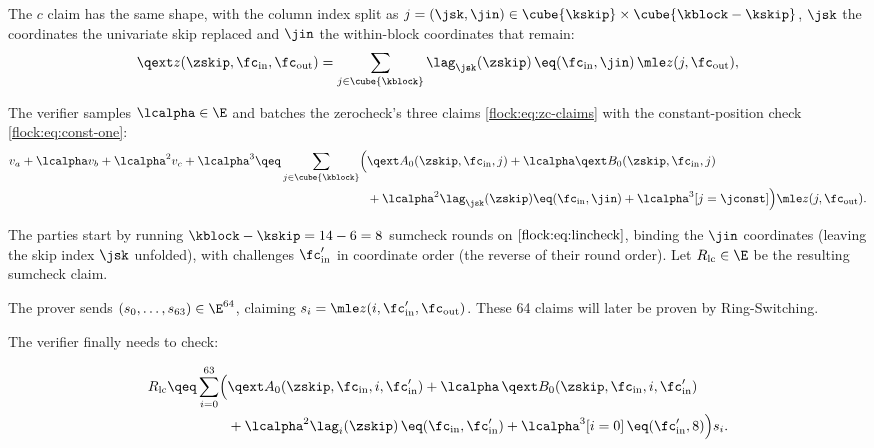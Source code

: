 The $c$ claim has the same shape, with the column index split as $j=(\jsk,\jin) \in\cube{\kskip} \times \cube{\kblock-\kskip}$, $\jsk$ the coordinates the univariate skip replaced and $\jin$ the within-block coordinates that remain:
\begin{equation}\label{flock:eq:c-as-column}
\qext z(\zskip,\fc_{\mathrm{in}},\fc_{\mathrm{out}})=\sum_{j\in\cube{\kblock}}\lag_{\jsk}(\zskip)\,\eq(\fc_{\mathrm{in}},\jin)\,\mle z(j,\fc_{\mathrm{out}}),
\end{equation}

\vspace{3mm}

The verifier samples $\lcalpha\in\E$ and batches the zerocheck's three claims \eqref{flock:eq:zc-claims} with the constant-position check \eqref{flock:eq:const-one}:
\begin{equation}\label{flock:eq:lincheck}
\begin{split}
v_a+\lcalpha v_b+\lcalpha^2v_c+\lcalpha^3\qeq\sum_{j\in\cube{\kblock}}\Bigl(&\qext A_0(\zskip,\fc_{\mathrm{in}},j)+\lcalpha\qext B_0(\zskip,\fc_{\mathrm{in}},j)\\
&+\lcalpha^2\lag_{\jsk}(\zskip)\eq(\fc_{\mathrm{in}},\jin)+\lcalpha^3[j=\jconst]\Bigr)\mle z(j,\fc_{\mathrm{out}}).
\end{split}
\end{equation}

\vspace{2mm}

The parties start by running $\kblock - \kskip = 14 - 6 = 8$ sumcheck rounds on $\eqref{flock:eq:lincheck}$, binding the $\jin$ coordinates (leaving the skip index $\jsk$ unfolded), with challenges $\fc'_{\mathrm{in}}$ in coordinate order (the reverse of their round order). Let $R_{\mathrm{lc}}\in\E$ be the resulting sumcheck claim.

The prover sends $(s_0,\ldots,s_{63})\in\E^{64}$, claiming $s_i=\mle z(i,\fc'_{\mathrm{in}},\fc_{\mathrm{out}})$. These 64 claims will later be proven by Ring-Switching.

The verifier finally needs to check:

\begin{equation}\label{flock:eq:lincheck-terminal}
\begin{split}
R_{\mathrm{lc}}\qeq\sum_{i=0}^{63}\Bigl(&\qext A_0(\zskip,\fc_{\mathrm{in}},i,\fc'_{\mathrm{in}})+\lcalpha\,\qext B_0(\zskip,\fc_{\mathrm{in}},i,\fc'_{\mathrm{in}})\\
&+\lcalpha^2\lag_i(\zskip)\,\eq(\fc_{\mathrm{in}},\fc'_{\mathrm{in}})+\lcalpha^3[i=0]\,\eq(\fc'_{\mathrm{in}},8)\Bigr)s_i.
\end{split}
\end{equation}

